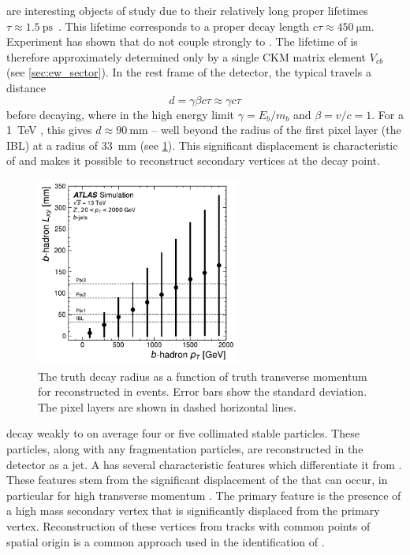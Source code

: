 \bhadrons are interesting objects of study due to their relatively long proper lifetimes $\tau \approx \SI{1.5}{\pico\second}$~\cite{PhysRevD.98.030001}.
This lifetime corresponds to a proper decay length $c \tau \approx \SI{450}{\micro\meter}$.
Experiment has shown that \bhadrons do not couple strongly to \lquarks \cite{PhysRevLett.52.1084}.
The lifetime of \bhadrons is therefore approximately determined only by a single CKM matrix element $V_{cb}$ (see \cref{sec:ew_sector}).
In the rest frame of the detector, the typical \bhadron travels a distance 
%
\begin{equation}
  d = \gamma \beta c \tau \approx \gamma c \tau
\end{equation}
%
before decaying, where in the high energy limit $\gamma = E_b/m_b$ and $\beta = v/c = 1$.
For a \SI{1}{\TeV} \bhadron, this gives $d \approx \SI{90}{\milli\meter}$ -- well beyond the radius of the first pixel layer (the IBL) at a radius of \SI{33}{\milli\meter} (see \cref{fig:b_lxy_vs_pt}).
This significant displacement is characteristic of \bjets and makes it possible to reconstruct secondary vertices at the \bhadron decay point.

\begin{figure}[!htbp]
  \centering
  \includegraphics[width=0.6\textwidth]{chapters/3.tracking/figs/b_pt_lxy.pdf}
  \caption{
    The truth \bhadron decay radius \Lxy as a function of truth transverse momentum \pt for reconstructed \bjets in \Zprime events.
    Error bars show the standard deviation.
    The pixel layers are shown in dashed horizontal lines.
  }
  \label{fig:b_lxy_vs_pt}
\end{figure}

\bhadrons decay weakly to on average four or five collimated stable particles.
These particles, along with any fragmentation particles, are reconstructed in the detector as a jet.
A \bjet has several characteristic features which differentiate it from \ljets.
These features stem from the significant displacement of the \bhadron that can occur, in particular for high transverse momentum \bjets.
The primary feature is the presence of a high mass secondary vertex that is significantly displaced from the primary vertex.
Reconstruction of these vertices from tracks with common points of spatial origin is a common approach used in the identification of \bjets.

